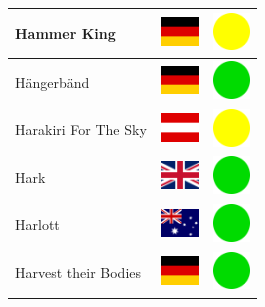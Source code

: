 \documentclass[12pt, a4paper, twoside]{report}
\begin{document}
\begin{center}
\begin{longtable}{|p{5cm}|p{2cm}|p{2cm}|}
 Hammer King                                                & \includegraphics[width=1cm]{../4x3/de} &   \includegraphics[width=1cm]{../likes/m} \\ \hline
 Hängerbänd                                                 & \includegraphics[width=1cm]{../4x3/de} &   \includegraphics[width=1cm]{../likes/y} \\ \hline
 Harakiri For The Sky                                       & \includegraphics[width=1cm]{../4x3/at} &   \includegraphics[width=1cm]{../likes/m} \\ \hline
 Hark                                                       & \includegraphics[width=1cm]{../4x3/gb} &   \includegraphics[width=1cm]{../likes/y} \\ \hline
 Harlott                                                    & \includegraphics[width=1cm]{../4x3/au} &   \includegraphics[width=1cm]{../likes/y} \\ \hline
 Harvest their Bodies                                       & \includegraphics[width=1cm]{../4x3/de} &   \includegraphics[width=1cm]{../likes/y} \\ \hline

\end{longtable}
\end{center}
\end{document}
